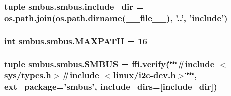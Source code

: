 \subsubsection[{include\+\_\+dir}]{\setlength{\rightskip}{0pt plus 5cm}tuple smbus.\+smbus.\+include\+\_\+dir = os.\+path.\+join(os.\+path.\+dirname(\+\_\+\+\_\+file\+\_\+\+\_\+), '..', 'include')}\label{namespacesmbus_1_1smbus_a6d081d56f12318506ac9dacee17e9bc3}
\hypertarget{namespacesmbus_1_1smbus_a7808549bfcca2a6d1a479b6005e5bc58}{}
\subsubsection[{M\+A\+X\+P\+A\+T\+H}]{\setlength{\rightskip}{0pt plus 5cm}int smbus.\+smbus.\+M\+A\+X\+P\+A\+T\+H = 16}\label{namespacesmbus_1_1smbus_a7808549bfcca2a6d1a479b6005e5bc58}
\hypertarget{namespacesmbus_1_1smbus_a12e727c180b256eccd92b0dba41c9654}{}
\subsubsection[{S\+M\+B\+U\+S}]{\setlength{\rightskip}{0pt plus 5cm}tuple smbus.\+smbus.\+S\+M\+B\+U\+S = ffi.\+verify(\char`\"{}\char`\"{}\char`\"{}\#include $<$sys/types.\+h$>$\#include $<$linux/i2c-\/dev.\+h$>$\char`\"{}\char`\"{}\char`\"{}, ext\+\_\+package='smbus', include\+\_\+dirs=\mbox{[}{\bf include\+\_\+dir}\mbox{]})}\label{namespacesmbus_1_1smbus_a12e727c180b256eccd92b0dba41c9654}
